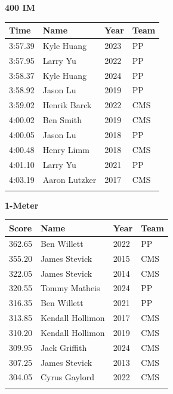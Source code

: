 \vspace{1.2em}
\noindent\begin{minipage}[t]{0.98\textwidth}
\centering
\textbf{\textcolor{teamprimary}{400 IM}}\par
\vspace{0.5em}
\centering
\small
\renewcommand{\arraystretch}{1.0}
\setlength{\tabcolsep}{4pt}
\begin{tabular}{@{}p{2.5cm}p{4.5cm}p{1.5cm}p{2.5cm}@{}}
\toprule
\textbf{Time} & \textbf{Name} & \textbf{Year} & \textbf{Team} \\
\midrule
3:57.39 & Kyle Huang & 2023 & PP \\
3:57.95 & Larry Yu & 2022 & PP \\
3:58.37 & Kyle Huang & 2024 & PP \\
3:58.92 & Jason Lu & 2019 & PP \\
3:59.02 & Henrik Barck & 2022 & CMS \\
4:00.02 & Ben Smith & 2019 & CMS \\
4:00.05 & Jason Lu & 2018 & PP \\
4:00.48 & Henry Limm & 2018 & CMS \\
4:01.10 & Larry Yu & 2021 & PP \\
4:03.19 & Aaron Lutzker & 2017 & CMS \\
\bottomrule
\vspace{0.5em}
\end{tabular}
\end{minipage}
\vspace{1.2em}
\noindent\begin{minipage}[t]{0.98\textwidth}
\centering
\textbf{\textcolor{teamprimary}{1-Meter}}\par
\vspace{0.5em}
\centering
\small
\renewcommand{\arraystretch}{1.0}
\setlength{\tabcolsep}{4pt}
\begin{tabular}{@{}p{2.5cm}p{4.5cm}p{1.5cm}p{2.5cm}@{}}
\toprule
\textbf{Score} & \textbf{Name} & \textbf{Year} & \textbf{Team} \\
\midrule
362.65 & Ben Willett & 2022 & PP \\
355.20 & James Stevick & 2015 & CMS \\
322.05 & James Stevick & 2014 & CMS \\
320.55 & Tommy Matheis & 2024 & PP \\
316.35 & Ben Willett & 2021 & PP \\
313.85 & Kendall Hollimon & 2017 & CMS \\
310.20 & Kendall Hollimon & 2019 & CMS \\
309.95 & Jack Griffith & 2024 & CMS \\
307.25 & James Stevick & 2013 & CMS \\
304.05 & Cyrus Gaylord & 2022 & CMS \\
\bottomrule
\vspace{0.5em}
\end{tabular}
\end{minipage}
